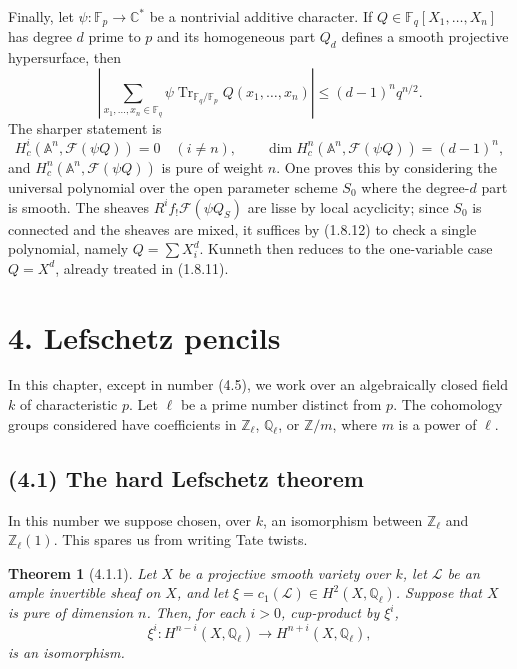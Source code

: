\documentclass[11pt]{article}
\newtheorem{theorem}{Theorem}
\theoremstyle{remark}
\newcommand{\CC}{\mathbb{C}}
\newcommand{\Fq}{\mathbb{F}_q}
\newcommand{\Fp}{\mathbb{F}_p}
\begin{document}
Finally, let $\psi:\Fp\to\CC^*$ be a nontrivial additive character. If $Q\in\Fq[X_1,\ldots,X_n]$ has degree $d$ prime to $p$ and its homogeneous part $Q_d$ defines a smooth projective hypersurface, then
\begin{equation}\tag{3.7.2.1}
\left|\sum_{x_1,\ldots,x_n\in\Fq}\psi\operatorname{Tr}_{\Fq/\Fp} Q(x_1,\ldots,x_n)\right|
\le (d-1)^n q^{n/2}.
\end{equation}
The sharper statement is
\begin{equation}\tag{3.7.2.3}
H^i_c(\mathbb A^n,\mathcal F(\psi Q))=0\quad (i\ne n),\qquad
\dim H^n_c(\mathbb A^n,\mathcal F(\psi Q))=(d-1)^n,
\end{equation}
and $H^n_c(\mathbb A^n,\mathcal F(\psi Q))$ is pure of weight $n$. One proves this by considering the universal polynomial over the open parameter scheme $S_0$ where the degree-$d$ part is smooth. The sheaves $R^if_{!}\mathcal F(\psi Q_S)$ are lisse by local acyclicity; since $S_0$ is connected and the sheaves are mixed, it suffices by (1.8.12) to check a single polynomial, namely $Q=\sum X_i^d$. Kunneth then reduces to the one-variable case $Q=X^d$, already treated in (1.8.11).


\section*{4. Lefschetz pencils}

In this chapter, except in number (4.5), we work over an algebraically closed field $k$ of characteristic $p$. Let $\ell$ be a prime number distinct from $p$. The cohomology groups considered have coefficients in $\mathbb Z_\ell$, $\mathbb Q_\ell$, or $\mathbb Z/m$, where $m$ is a power of $\ell$.

\subsection*{(4.1) The hard Lefschetz theorem}

In this number we suppose chosen, over $k$, an isomorphism between $\mathbb Z_\ell$ and $\mathbb Z_\ell(1)$. This spares us from writing Tate twists.

\begin{theorem}[4.1.1]
Let $X$ be a projective smooth variety over $k$, let $\mathcal L$ be an ample invertible sheaf on $X$, and let $\xi=c_1(\mathcal L)\in H^2(X,\mathbb Q_\ell)$. Suppose that $X$ is pure of dimension $n$. Then, for each $i>0$, cup-product by $\xi^i$,
\[
 \xi^i:H^{n-i}(X,\mathbb Q_\ell)\longrightarrow H^{n+i}(X,\mathbb Q_\ell),
\]
is an isomorphism.
\end{theorem}
\end{document}
